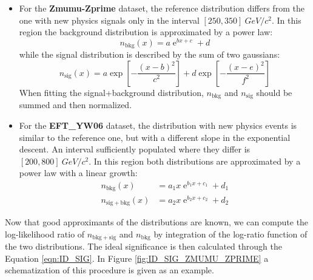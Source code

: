 \begin{itemize}
	\item For the \textbf{Zmumu-Zprime} dataset, the reference distribution differs from the one with new physics signals only in the interval $[250,350]~\si{GeV/c^2}$. In this region the background distribution is approximated by a power law:
	\begin{equation}
		n_\mathrm{bkg}(x) = a\operatorname{e}^{bx + c} + d
	\end{equation}
	while the signal distribution is described by the sum of two gaussians:
	\begin{equation}
		n_\mathrm{sig}(x) = a\exp{\left[-\frac{(x-b)^2}{c^2}\right]} 
		+ d\exp{\left[-\frac{(x-e)^2}{f^2}\right]}
	\end{equation}
	When fitting the signal+background distribution, $n_\mathrm{bkg}$ and $n_\mathrm{sig}$ should be summed and then normalized.
	
	\item For the \textbf{EFT\_YW06} dataset, the distribution with new physics events is similar to the reference one, but with a different slope in the exponential descent. An interval sufficiently populated where they differ is $[200,800]~\si{GeV/c^2}$. In this region both distributions are approximated by a power law with a linear growth:
	\begin{align}
		n_\mathrm{bkg}(x) &= a_{1}x\operatorname{e}^{b_{1}x + c_{1}} + d_{1}	\\
		n_\mathrm{sig+bkg}(x) &= a_{2}x\operatorname{e}^{b_{2}x + c_{2}} + d_{2}
	\end{align}
\end{itemize}

Now that good approximants of the distributions are known, we can compute the log-likelihood ratio of $n_\mathrm{bkg+sig}$ and $n_\mathrm{bkg}$ by integration of the log-ratio function of the two distributions. The ideal significance is then calculated through the Equation \ref{eqn:ID_SIG}. In Figure \ref{fig:ID_SIG_ZMUMU_ZPRIME} a schematization of this procedure is given as an example.

